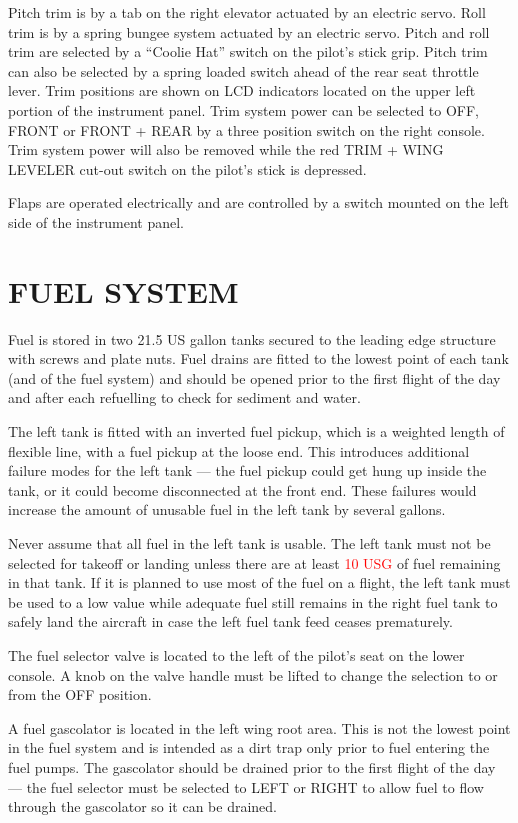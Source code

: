 Pitch trim is by a tab on the right elevator actuated by an electric servo. Roll trim is by a spring bungee system actuated by an electric servo. Pitch and roll trim are selected by a ``Coolie Hat'' switch on the pilot's stick grip. Pitch trim can also be selected by a spring loaded switch ahead of the rear seat throttle lever. Trim positions are shown on LCD indicators located on the upper left portion of the instrument panel. Trim system power can be selected to OFF, FRONT or FRONT + REAR by a three position switch on the right console. Trim system power will also be removed while the red TRIM + WING LEVELER cut-out switch on the pilot's stick is depressed.

Flaps are operated electrically and are controlled by a switch mounted on the left side of the instrument panel.

\section{FUEL SYSTEM} Fuel is stored in two 21.5 US gallon tanks secured to the leading edge structure with screws and plate nuts. Fuel drains are fitted to the lowest point of each tank (and of the fuel system) and should be opened prior to the first flight of the day and after each refuelling to check for sediment and water.

The left tank is fitted with an inverted fuel pickup, which is a weighted length of flexible line, with a fuel pickup at the loose end. This introduces additional failure modes for the left tank --- the fuel pickup could get hung up inside the tank, or it could become disconnected at the front end. These failures would increase the amount of unusable fuel in the left tank by several gallons.
\begin{Note}
[WARNING] Never assume that all fuel in the left tank is usable. The left tank must not be selected for takeoff or landing unless there are at least \textcolor{red}{10 USG} of fuel remaining in that tank. If it is planned to use most of the fuel on a flight, the left tank must be used to a low value while adequate fuel still remains in the right fuel tank to safely land the aircraft in case the left fuel tank feed ceases prematurely.
\end{Note}

The fuel selector valve is located to the left of the pilot's seat on the lower console. A knob on the valve handle must be lifted to change the selection to or from the OFF position.

A fuel gascolator is located in the left wing root area. This is not the lowest point in the fuel system and is intended as a dirt trap only prior to fuel entering the fuel pumps. The gascolator should be drained prior to the first flight of the day --- the fuel selector must be selected to LEFT or RIGHT to allow fuel to flow through the gascolator so it can be drained.

